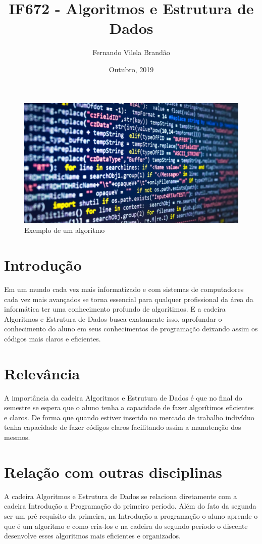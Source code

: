 \documentclass{article}
\title{IF672 - Algoritmos e Estrutura de Dados}
\author{Fernando Vilela Brandão }
\date{Outubro, 2019}
\begin{document}
\maketitle

\begin{figure}[h!]
\centering
\includegraphics[scale=0.3]{algoritmos-990x556.jpg}
\caption{Exemplo de um algoritmo\citep{algo}}
\label{fig:algoritmos-990x556.jpg}
\end{figure}
\section{Introdução}
Em um mundo cada vez mais informatizado e com sistemas de computadores cada vez mais avançados se torna essencial para qualquer profissional da área da informática ter uma conhecimento profundo de algorítimos. E a cadeira Algoritmos e Estrutura de Dados busca exatamente isso, aprofundar o conhecimento do aluno em seus conhecimentos de programação deixando assim os códigos mais claros e eficientes.
\section{Relevância}
A importância da cadeira Algoritmos e Estrutura de Dados é que no final do semestre se espera que o aluno tenha a capacidade de fazer algorítimos eficientes e claros. De forma que quando estiver inserido no mercado de trabalho  indivíduo tenha capacidade de fazer códigos claros facilitando assim a manutenção dos mesmos.\citep{cinWiki} 
\label{fig:my_label}
\section{Relação com outras disciplinas}

A cadeira Algoritmos e Estrutura de Dados se relaciona diretamente com a cadeira Introdução a Programação do primeiro período. Além do fato da segunda ser um pré requisito da primeira, na Introdução a programação o aluno aprende o que é um algoritmo e como cria-los e na cadeira do segundo período o discente desenvolve esses algoritmos mais eficientes e organizados.\citep{Perfil}
\label{fig:my_label}



\end{document}
